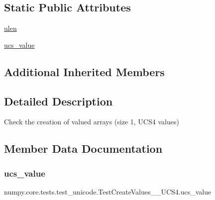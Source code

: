 \subsection*{Static Public Attributes}
\begin{DoxyCompactItemize}
\item 
\hyperlink{classnumpy_1_1core_1_1tests_1_1test__unicode_1_1TestCreateValues__1__UCS4_a589b5dcf5cdd1aad2f4ccacbc787f742}{ulen}
\item 
\hyperlink{classnumpy_1_1core_1_1tests_1_1test__unicode_1_1TestCreateValues__1__UCS4_a8423b8a439c156f4436bb9c4fc2e3274}{ucs\+\_\+value}
\end{DoxyCompactItemize}
\subsection*{Additional Inherited Members}


\subsection{Detailed Description}
\begin{DoxyVerb}Check the creation of valued arrays (size 1, UCS4 values)\end{DoxyVerb}
 

\subsection{Member Data Documentation}
\mbox{\label{classnumpy_1_1core_1_1tests_1_1test__unicode_1_1TestCreateValues__1__UCS4_a8423b8a439c156f4436bb9c4fc2e3274}} 
\subsubsection{\texorpdfstring{ucs\+\_\+value}{ucs\_value}}
{\footnotesize\ttfamily numpy.\+core.\+tests.\+test\+\_\+unicode.\+Test\+Create\+Values\+\_\+\_\+\+U\+C\+S4.\+ucs\+\_\+value\hspace{0.3cm}{\ttfamily [static]}}

